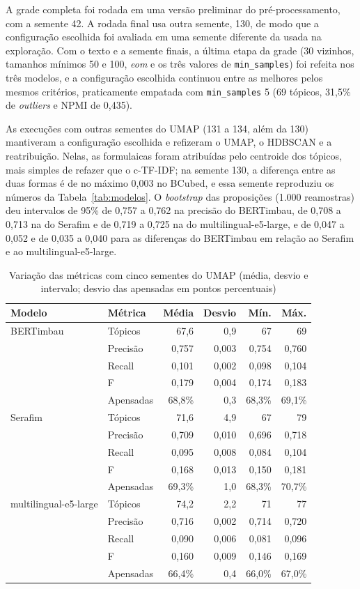 \documentclass[12pt]{article}
\newcommand{\tabfont}{\fontsize{9}{11}\selectfont\setlength{\tabcolsep}{2.5pt}}
\begin{document}
A grade completa foi rodada em uma versão preliminar do pré-processamento, com a semente 42. A rodada final usa outra semente, 130, de modo que a configuração escolhida foi avaliada em uma semente diferente da usada na exploração. Com o texto e a semente finais, a última etapa da grade (30 vizinhos, tamanhos mínimos 50 e 100, \textit{eom} e os três valores de \texttt{min\_samples}) foi refeita nos três modelos, e a configuração escolhida continuou entre as melhores pelos mesmos critérios, praticamente empatada com \texttt{min\_samples} 5 (69 tópicos, 31,5\% de \textit{outliers} e NPMI de 0,435).

As execuções com outras sementes do UMAP (131 a 134, além da 130) mantiveram a configuração escolhida e refizeram o UMAP, o HDBSCAN e a reatribuição. Nelas, as formulaicas foram atribuídas pelo centroide dos tópicos, mais simples de refazer que o c-TF-IDF; na semente 130, a diferença entre as duas formas é de no máximo 0,003 no BCubed, e essa semente reproduziu os números da Tabela~\ref{tab:modelos}. O \textit{bootstrap} das proposições (1.000 reamostras) deu intervalos de 95\% de 0,757 a 0,762 na precisão do BERTimbau, de 0,708 a 0,713 na do Serafim e de 0,719 a 0,725 na do multilingual-e5-large, e de 0,047 a 0,052 e de 0,035 a 0,040 para as diferenças do BERTimbau em relação ao Serafim e ao multilingual-e5-large.

\begin{table}[H]
\centering
\caption{Variação das métricas com cinco sementes do UMAP (média, desvio e intervalo; desvio das apensadas em pontos percentuais)}
\label{tab:sementes}
\tabfont
\begin{tabular}{l l r r r r}
\toprule
\textbf{Modelo} & \textbf{Métrica} & \textbf{Média} & \textbf{Desvio} & \textbf{Mín.} & \textbf{Máx.} \\
\midrule
BERTimbau & Tópicos & 67,6 & 0,9 & 67 & 69 \\
 & Precisão & 0,757 & 0,003 & 0,754 & 0,760 \\
 & Recall & 0,101 & 0,002 & 0,098 & 0,104 \\
 & F & 0,179 & 0,004 & 0,174 & 0,183 \\
 & Apensadas & 68,8\% & 0,3 & 68,3\% & 69,1\% \\
\midrule
Serafim & Tópicos & 71,6 & 4,9 & 67 & 79 \\
 & Precisão & 0,709 & 0,010 & 0,696 & 0,718 \\
 & Recall & 0,095 & 0,008 & 0,084 & 0,104 \\
 & F & 0,168 & 0,013 & 0,150 & 0,181 \\
 & Apensadas & 69,3\% & 1,0 & 68,3\% & 70,7\% \\
\midrule
multilingual-e5-large & Tópicos & 74,2 & 2,2 & 71 & 77 \\
 & Precisão & 0,716 & 0,002 & 0,714 & 0,720 \\
 & Recall & 0,090 & 0,006 & 0,081 & 0,096 \\
 & F & 0,160 & 0,009 & 0,146 & 0,169 \\
 & Apensadas & 66,4\% & 0,4 & 66,0\% & 67,0\% \\
\bottomrule
\end{tabular}
\end{table}
\end{document}
